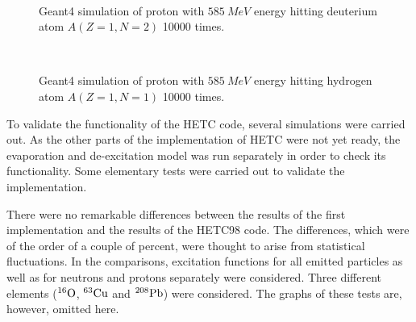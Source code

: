 \begin{figure}
  \begin{center}
    \leavevmode
    \mbox{\epsfxsize=13cm  }
       \caption{ Geant4 simulation of proton with $585~MeV$ energy hitting deuterium atom $A(Z = 1,N = 2)$ 10000 times.}
  \label{pic:z001n002p001e000585c010h000}
  \end{center}
\end{figure}



\begin{figure}
  \begin{center}
    \leavevmode
    \mbox{\epsfxsize=13cm  }
       \caption{ Geant4 simulation of proton with $585~MeV$ energy hitting hydrogen atom $A(Z = 1,N = 1)$ 10000 times.}
  \label{pic:z001n001p001e000585c010h000}
  \end{center}
\end{figure}

To validate the functionality of the HETC code, several simulations
were carried out. As the other parts of the implementation of HETC
were not yet ready, the evaporation and de-excitation model was run
separately in order to check its functionality. Some elementary tests
were carried out to validate the implementation. 

There were no remarkable differences between the results of the first
implementation and the results of the HETC98 code. The differences, which
were of the order of a couple of percent, were thought to arise from
statistical fluctuations. In the comparisons, excitation functions for
all emitted particles as well as for neutrons and protons separately
were considered. Three different elements ($^{16}{\rm O}$, $^{63}{\rm
  Cu}$ and $^{208}{\rm Pb}$) were considered. The graphs of these
tests are, however, omitted here.


